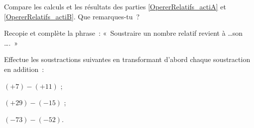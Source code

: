 \begin{activite}
\begin{partie}
Compare les calculs et les résultats des parties \ref{OpererRelatifs_actiA} et \ref{OpererRelatifs_actiB}. Que remarques-tu ?

Recopie et complète la phrase : « Soustraire un nombre relatif revient à \ldots son \ldots . »
\end{partie}

\begin{partie}
Effectue les soustractions suivantes en transformant d'abord chaque soustraction en addition :
\begin{colenumerate}{3}
 \item $(+7) - (+11)$ ;
 \item $(+29) - (-15)$ ;
 \item $(-73) - (-52)$.
 \end{colenumerate}
\end{partie}

\end{activite}



